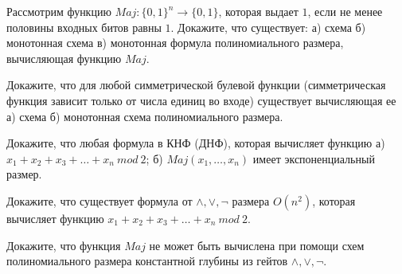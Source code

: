 \setcounter{curtask}{1}


\begin{task}
    Рассмотрим функцию $Maj: \{0, 1\}^n \rightarrow \{0, 1\}$, которая выдает $1$, если не менее половины входных битов равны
    $1$. Докажите, что существует: а) схема б) монотонная схема в) монотонная формула полиномиального размера, вычисляющая функцию
    $Maj$.
\end{task}

\begin{task}
    Докажите, что для любой симметрической булевой функции (симметрическая функция зависит только от числа единиц во входе)
    существует вычисляющая ее а) схема б) монотонная схема полиномиального размера.
\end{task}

\begin{task}
    Докажите, что любая формула в КНФ (ДНФ), которая вычисляет функцию а) $x_1 + x_2 + x_3 + \dots + x_n ~mod~ 2$; б) $Maj(x_1,
    \dots, x_n)$ имеет экспоненциальный размер.
\end{task}

\begin{task}
    Докажите, что существует формула от $\land, \lor, \neg$ размера $O(n^2)$, которая вычисляет функцию $x_1 + x_2 + x_3 + \dots
    + x_n ~mod~ 2$.
\end{task}

\begin{task}
    Докажите, что функция $Maj$ не может быть вычислена при помощи схем полиномиального размера константной глубины из гейтов
    $\land, \lor, \neg$.
\end{task}